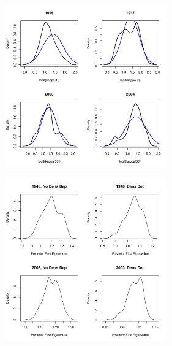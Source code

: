 \documentclass[mathserif,compress]{beamer}
\begin{document}
\begin{frame} 

\begin{center}
	\includegraphics[height=7cm]{figure/Post_kappa} 
\end{center}
\end{frame}


\begin{frame} 

\begin{center}
	\includegraphics[height=7cm]{figure/Post_eigval} 
\end{center}
\end{frame}


\end{document}
